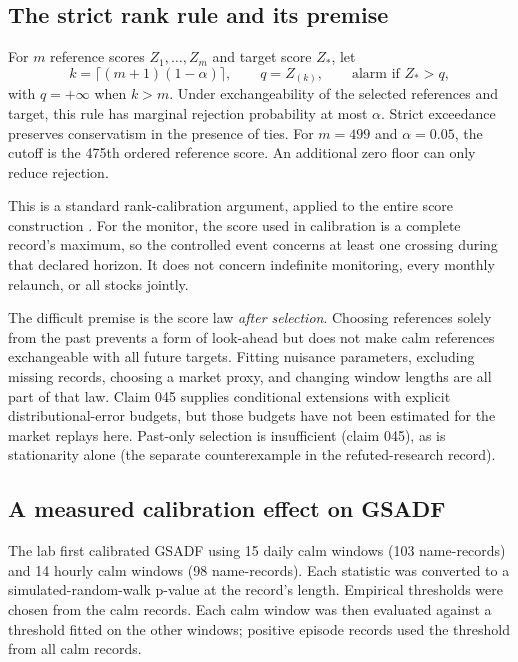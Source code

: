 \subsection{The strict rank rule and its premise}
For $m$ reference scores $Z_1,\ldots,Z_m$ and target score $Z_*$, let
\begin{equation}\label{eq:rank}
 k=\lceil(m+1)(1-\alpha)\rceil,\qquad q=Z_{(k)},
 \qquad \text{alarm if }Z_*>q,
\end{equation}
with $q=+\infty$ when $k>m$. Under exchangeability of the selected references
and target, this rule has marginal rejection probability at most $\alpha$.
Strict exceedance preserves conservatism in the presence of ties. For
$m=499$ and $\alpha=0.05$, the cutoff is the 475th ordered reference score.
An additional zero floor can only reduce rejection.

This is a standard rank-calibration argument, applied to the entire score
construction \cite{tibshirani2019conformal}. For the monitor, the score used in
calibration is a complete record's maximum, so the controlled event concerns
at least one crossing during that declared horizon. It does not concern
indefinite monitoring, every monthly relaunch, or all stocks jointly.

The difficult premise is the score law \emph{after selection}. Choosing
references solely from the past prevents a form of look-ahead but does not
make calm references exchangeable with all future targets. Fitting nuisance
parameters, excluding missing records, choosing a market proxy, and changing
window lengths are all part of that law. Claim 045 supplies conditional
extensions with explicit distributional-error budgets, but those budgets
have not been estimated for the market replays here. Past-only selection is insufficient (claim 045), as is stationarity alone
(the separate counterexample in the refuted-research record).

\subsection{A measured calibration effect on GSADF}
The lab first calibrated GSADF using 15 daily calm windows (103 name-records)
and 14 hourly calm windows (98 name-records). Each statistic was converted
to a simulated-random-walk p-value at the record's length. Empirical
thresholds were chosen from the calm records. Each calm window was then
evaluated against a threshold fitted on the other windows; positive episode
records used the threshold from all calm records.

